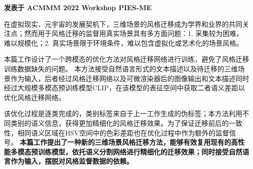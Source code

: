 \documentclass{resume}
\begin{document}
\begin{spacing}{1.2}
  \textbf{发表于 ACMMM 2022 Workshop PIES-ME}

  \vspace{0.5em}
  在虚拟现实、元宇宙的发展契机下，三维场景的风格迁移成为学界和业界的共同关注点；然而用于风格迁移的监督用真实场景具有多方面问题：1. 采集较为困难，难以规模化；2. 真实场景限于环境条件，难以包含虚拟化或艺术化的场景风格。
  
  \vspace{0.5em}
  本篇工作设计了一个跨模态的优化方法对风格迁移网络进行训练，避免了风格迁移训练数据缺失的问题。
  本方法接受自然语言形式的文本描述以及待迁移的三维场景作为输入，后者经过风格迁移网络以及可微渲染器后的图像输出和文本描述同时经过大规模多模态预训练模型CLIP，在该模型的表征空间中获取二者语义差距以优化风格迁移网络。
  
  \vspace{0.5em}
  该优化过程是逐类完成的，类别标签来自于上一工作生成的伪标签；本方法利用不同类别的语义信息，获得更加精细化的风格迁移效果。为了保证迁移前后的一致性，相同语义区域在HSV空间中的色彩差距也在优化过程中作为额外的监督信号。
  \textbf{本篇工作提出了一种新的三维场景风格迁移方法，能够有效复用现有的高性能多模态预训练模型，依托语义分割网络进行精细化的迁移效果；同时接受自然语言作为输入，摆脱对风格监督数据的依赖。}

\end{spacing}
\end{document}
